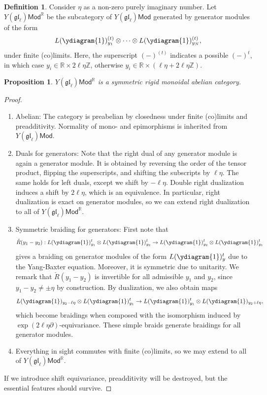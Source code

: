 \documentclass[11pt]{report}
\newtheorem{prop}[theorem]{Proposition}
\theoremstyle{definition}
\newtheorem{definition}[theorem]{Definition}
\theoremstyle{remark}
\theoremstyle{remark}
\newcommand{\Z}{\mathbb{Z}}
\newcommand{\R}{\mathbb{R}}
\begin{document}
\begin{definition}
Consider $\eta$ as a non-zero purely imaginary number. Let $Y(\mathfrak{gl}_\ell)\mathsf{Mod}^\R$ be the subcategory of $Y(\mathfrak{gl}_\ell)\mathsf{Mod}$ generated by generator modules of the form
\begin{equation*}
L(\ydiagram{1})_{y_1}^{(t)} \otimes \cdots \otimes L(\ydiagram{1})_{y_N}^{(t)},
\end{equation*}
under finite (co)limits. Here,  the superscript $(-)^{(t)}$ indicates a possible $(-)^t$, in which case $y_i \in \R \times 2\ell\eta\Z$, otherwise $y_i \in \R \times (\ell\eta + 2\ell\eta\Z)$.
\end{definition}

\begin{prop}
$Y(\mathfrak{gl}_\ell)\mathsf{Mod}^\R$ is a symmetric rigid monoidal abelian category.
\end{prop}

\begin{proof}
\begin{enumerate}
\item Abelian: The category is preabelian by closedness under finite (co)limits and preadditivity. Normality of mono- and epimorphisms is inherited from $Y(\mathfrak{gl}_\ell)\mathsf{Mod}$.
\item Duals for generators: Note that the right dual of any generator module is again a generator module. It is obtained by reversing the order of the tensor product, flipping the superscripts, and shifting the subscripts by $\ell \eta$. The same holds for left duals, except we shift by $-\ell\eta$. Double right dualization induces a shift by $2\ell\eta$, which is an equivalence. In particular, right dualization is exact on generator modules, so we can extend right dualization to all of $Y(\mathfrak{gl}_\ell)\mathsf{Mod}^\R$.
\item Symmetric braiding for generators: First note that
\begin{equation*}
\check R(y_1-y_2): L(\ydiagram{1})_{y_1}^t \otimes L(\ydiagram{1})_{y_2}^t \to L(\ydiagram{1})_{y_2}^t \otimes L(\ydiagram{1})_{y_1}^t
\end{equation*}
gives a braiding on generator modules of the form $L(\ydiagram{1})_y^t$ due to the Yang-Baxter equation. Moreover, it is symmetric due to unitarity. We remark that $\check R(y_1-y_2)$ is invertible for all admissible $y_1$ and $y_2$, since $y_1-y_2 \neq \pm \eta$ by construction. By dualization, we also obtain maps
\begin{equation*}
L(\ydiagram{1})_{y_2-\ell\eta} \otimes L(\ydiagram{1})_{y_1}^t \to L(\ydiagram{1})_{y_1}^t \otimes L(\ydiagram{1})_{y_2+\ell\eta},
\end{equation*}
which become braidings when composed with the isomorphism induced by $\exp(2\ell\eta \partial)$-equivariance. These simple braids generate braidings for all generator modules.
\item Everything in sight commutes with finite (co)limits, so we may extend to all of $Y(\mathfrak{gl}_\ell)\mathsf{Mod}^\R$.
\end{enumerate}
If we introduce shift equivariance, preadditivity will be destroyed, but the essential features should survive.
\end{proof}
\end{document}
